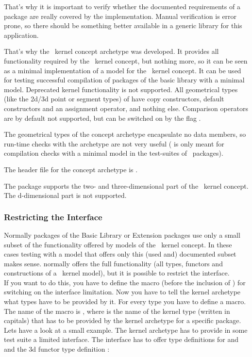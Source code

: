 That's why it is important to verify whether the documented requirements of a
package are really covered by the implementation. Manual verification is error
prone, so there should be something better available in a generic library for
this application.

That's why the \cgal\ kernel concept archetype  was
developed. It provides all functionality required by the \cgal\ kernel concept,
but nothing more, so it can be seen as a minimal implementation of a model for
the \cgal\ kernel concept.  It can be used for testing successful compilation of
packages of the basic library with a minimal model. Deprecated kernel
functionality is not supported. All geometrical types (like the 2d/3d point or
segment types) of  have copy constructors, default
constructors and an assignment operator, and nothing else.  Comparison
operators are by default not supported, but can be switched on by the flag .

The geometrical types of the concept archetype encapsulate no data members, so
run-time checks with the archetype are not very useful
( is only meant for compilation checks with a
minimal model in the test-suites of \cgal\ packages).

The header file for the concept archetype is .

The package supports the two- and three-dimensional part of the \cgal\ kernel
concept. The d-dimensional part is not supported.

\subsubsection{Restricting the Interface}

Normally packages of the Basic Library or Extension packages use only a small
subset of the functionality offered by models of the \cgal\ kernel concept. In
these cases testing with a model that offers only this (used and) documented
subset makes sense.  normally offers the full
functionality (all types, functors and constructions of a \cgal\ kernel model),
but it is possible to restrict the interface.\\ If you want to do this, you
have to define the macro  (before the
inclusion of ) for switching on the interface
limitation. Now you have to tell the kernel archetype what types have to be
provided by it. For every type you have to define a macro.  The name of the
macro is , where  is the name of the kernel type (written in capitals)
that has to be provided by the kernel archetype for a specific package.  Lets
have a look at a small example. The kernel archetype has to provide in some
test suite a limited interface.  The interface has to offer type definitions
for  and  and the 3d  functor type
definition :

